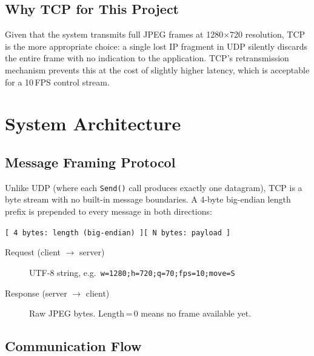\documentclass[12pt,a4paper]{article}
\begin{document}
\subsection{Why TCP for This Project}

Given that the system transmits full JPEG frames at 1280$\times$720 resolution, TCP is
the more appropriate choice: a single lost IP fragment in UDP silently discards the
entire frame with no indication to the application. TCP's retransmission mechanism
prevents this at the cost of slightly higher latency, which is acceptable for a
10\,FPS control stream.

\section{System Architecture}

\subsection{Message Framing Protocol}

Unlike UDP (where each \texttt{Send()} call produces exactly one datagram), TCP is a
byte stream with no built-in message boundaries. A 4-byte big-endian length prefix is
prepended to every message in both directions:

\begin{center}
\texttt{[ 4 bytes: length (big-endian) ][ N bytes: payload ]}
\end{center}

\begin{description}
    \item[Request (client $\to$ server)] UTF-8 string, e.g.\ \texttt{w=1280;h=720;q=70;fps=10;move=S}
    \item[Response (server $\to$ client)] Raw JPEG bytes. Length\,=\,0 means no frame
    available yet.
\end{description}

\subsection{Communication Flow}
\end{document}
